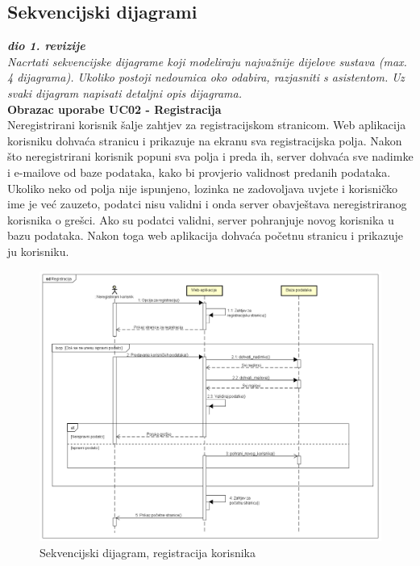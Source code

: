 			\subsection{Sekvencijski dijagrami}
				
				\textbf{\textit{dio 1. revizije}}\\
				
				\textit{Nacrtati sekvencijske dijagrame koji modeliraju najvažnije dijelove sustava (max. 4 dijagrama). Ukoliko postoji nedoumica oko odabira, razjasniti s asistentom. Uz svaki dijagram napisati detaljni opis dijagrama.}\\
				
				
				
				\textbf{Obrazac uporabe UC02 - Registracija}\\
				
				Neregistrirani korisnik šalje zahtjev za registracijskom stranicom. Web aplikacija korisniku dohvaća stranicu i prikazuje na ekranu sva registracijska polja. Nakon što neregistrirani korisnik popuni sva polja i preda ih, server dohvaća sve nadimke i e-mailove od baze podataka, kako bi provjerio validnost predanih podataka. Ukoliko neko od polja nije ispunjeno, lozinka ne zadovoljava uvjete i korisničko ime je već zauzeto, podatci nisu validni i onda server obavještava neregistriranog korisnika o grešci. Ako su podatci validni, server pohranjuje novog korisnika u bazu podataka. Nakon toga web aplikacija dohvaća početnu stranicu i prikazuje ju korisniku.
				
				\begin{figure}[H]
					\includegraphics[width=\textwidth]{dijagrami/SeqDiagram1.PNG} 
					\caption{Sekvencijski dijagram, registracija korisnika}
					\label{fig:SeqDiagram1}
				\end{figure}

